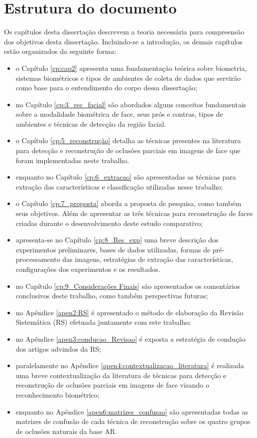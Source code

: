\section{Estrutura do documento}
Os capítulos desta dissertação descrevem a teoria necessária para compreensão dos objetivos desta dissertação. Incluindo-se a introdução, os demais capítulos estão organizados da seguinte forma:
\begin{itemize}

\item o Capítulo \ref{cp:cap2}  apresenta uma fundamentação teórica sobre biometria, sistemas biométricos e tipos de ambientes de coleta de dados que servirão como base para o entendimento do corpo dessa dissertação;

\item  no Capítulo \ref{cp:3_rec_facial} são abordados alguns conceitos fundamentais sobre a modalidade biométrica de face, seus prós e contras, tipos de ambientes e técnicas de detecção da região facial.

\item o Capítulo \ref{cp:5_reconstrução} detalha as técnicas presentes na literatura  para detecção e reconstrução de oclusões parciais em imagens de face que foram implementadas neste trabalho.

\item enquanto no Capítulo \ref{cp:6_extracao} são apresentadas as técnicas para extração das características e classificação utilizadas nesse trabalho;

\item o Capítulo \ref{cp:7_proposta} aborda  a proposta de pesquisa, como também seus objetivos. Além de apresentar as três técnicas para reconstrução de faces criadas durante o desenvolvimento deste estudo comparativo;

\item apresenta-se no Capítulo \ref{cp:8_Res_exp} uma breve descrição dos experimentos preliminares, bases de dados utilizadas, formas de pré-processamento das imagens, estratégias de extração das características, configurações dos experimentos e os resultados.

\item no Capítulo \ref{cp:9_Considerações Finais} são apresentados os comentários conclusivos deste trabalho, como também perspectivas futuras;

\item no Apêndice \ref{apen2:RS} é apresentado o método de elaboração da Revisão Sistemática (RS) efetuada juntamente com este trabalho;
\item no Apêndice \ref{apen3:conducao_Revisao} é exposta a estratégia de condução dos artigos advindos da RS;
\item paralelamente no Apêndice \ref{apen4:contextualizacao_literatura} é realizada uma breve contextualização da literatura de técnicas para detecção e reconstrução de oclusões parciais em imagens de face visando o reconhecimento biométrico;
\item enquanto no Apêndice \ref{apen6:matrizes_confusao} são apresentadas todas as matrizes de confusão de cada técnica de reconstrução sobre os quatro grupos de oclusões naturais da base AR.


\end{itemize}
